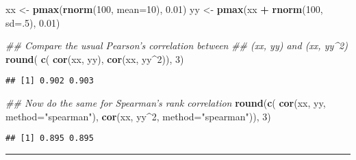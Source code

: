 \documentclass[]{book}
\newenvironment{Shaded}{\begin{snugshade}}{\end{snugshade}}
\newcommand{\CommentTok}[1]{\textcolor[rgb]{0.56,0.35,0.01}{\textit{#1}}}
\newcommand{\DataTypeTok}[1]{\textcolor[rgb]{0.13,0.29,0.53}{#1}}
\newcommand{\DecValTok}[1]{\textcolor[rgb]{0.00,0.00,0.81}{#1}}
\newcommand{\FloatTok}[1]{\textcolor[rgb]{0.00,0.00,0.81}{#1}}
\newcommand{\KeywordTok}[1]{\textcolor[rgb]{0.13,0.29,0.53}{\textbf{#1}}}
\newcommand{\NormalTok}[1]{#1}
\newcommand{\OperatorTok}[1]{\textcolor[rgb]{0.81,0.36,0.00}{\textbf{#1}}}
\newcommand{\StringTok}[1]{\textcolor[rgb]{0.31,0.60,0.02}{#1}}
\begin{document}
\begin{Shaded}
\begin{Highlighting}[]
\NormalTok{xx <-}\StringTok{ }\KeywordTok{pmax}\NormalTok{(}\KeywordTok{rnorm}\NormalTok{(}\DecValTok{100}\NormalTok{, }\DataTypeTok{mean=}\DecValTok{10}\NormalTok{), }\FloatTok{0.01}\NormalTok{)}
\NormalTok{yy <-}\StringTok{ }\KeywordTok{pmax}\NormalTok{(xx }\OperatorTok{+}\StringTok{ }\KeywordTok{rnorm}\NormalTok{(}\DecValTok{100}\NormalTok{, }\DataTypeTok{sd=}\NormalTok{.}\DecValTok{5}\NormalTok{), }\FloatTok{0.01}\NormalTok{)}

\CommentTok{## Compare the usual Pearson's correlation between }
\CommentTok{## (xx, yy) and (xx, yy^2)}
\KeywordTok{round}\NormalTok{( }\KeywordTok{c}\NormalTok{( }\KeywordTok{cor}\NormalTok{(xx, yy), }\KeywordTok{cor}\NormalTok{(xx, yy}\OperatorTok{^}\DecValTok{2}\NormalTok{)), }\DecValTok{3}\NormalTok{)}
\end{Highlighting}
\end{Shaded}

\begin{verbatim}
## [1] 0.902 0.903
\end{verbatim}

\begin{Shaded}
\begin{Highlighting}[]
\CommentTok{## Now do the same for Spearman's rank correlation}
\KeywordTok{round}\NormalTok{(}\KeywordTok{c}\NormalTok{( }\KeywordTok{cor}\NormalTok{(xx, yy, }\DataTypeTok{method=}\StringTok{"spearman"}\NormalTok{), }
         \KeywordTok{cor}\NormalTok{(xx, yy}\OperatorTok{^}\DecValTok{2}\NormalTok{, }\DataTypeTok{method=}\StringTok{"spearman"}\NormalTok{)), }\DecValTok{3}\NormalTok{)}
\end{Highlighting}
\end{Shaded}

\begin{verbatim}
## [1] 0.895 0.895
\end{verbatim}

\begin{center}\rule{0.5\linewidth}{\linethickness}\end{center}
\end{document}
